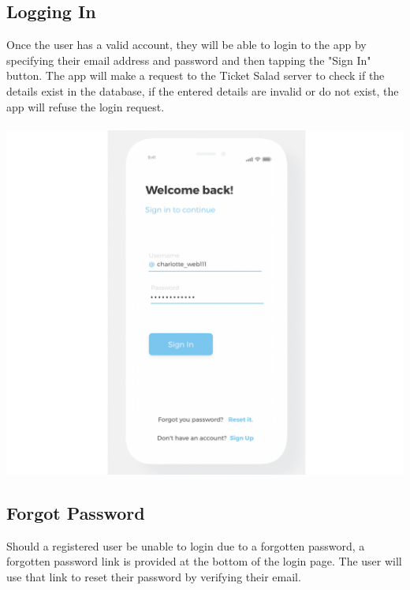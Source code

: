 \documentclass[11pt]{article}
\begin{document}
	\subsection{Logging In}
	Once the user has a valid account, they will be able to login to the app by specifying their
	email address and password and then tapping the "Sign In" button. The app will make a request
	to the Ticket Salad server to check if the details exist in the database, if the entered details are
	invalid or do not exist, the app will refuse the login request.
	\\
	\\
	\includegraphics[width=\linewidth]{login.png}
	
	\subsection{Forgot Password}
	Should a registered user be unable to login due to a forgotten password, a
	forgotten password link is provided at the bottom of the login page. The user
	will use that link to reset their password by verifying their email.
	\pagebreak
\end{document}
